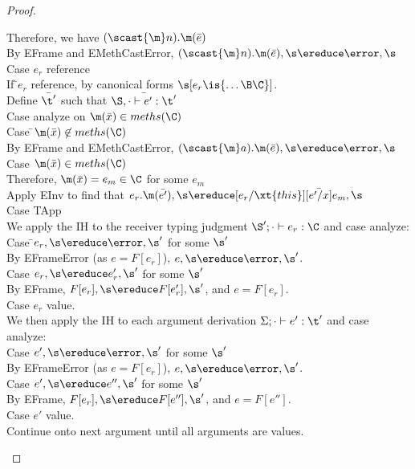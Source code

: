 \documentclass{report}
\begin{document}
\begin{proof}
\begin{tabbing}
\> \> \> Therefore, we have $(\scast{\m}n).\m(\bar{e})$\\
\> \> \> By EFrame and EMethCastError, $(\scast{\m}n).\m(\bar{e}),\s \ereduce \error,\s$\\
\> \> Case $e_r$ reference \\
\> \> \> If \=$e_r$ reference, by canonical forms $\s[e_r \is \{\ldots \B \C \}]$.\\
\> \> \> Define $\bar{\t'}$ such that $\bar{\S,\cdot \vdash e' : \t'}$\\
\> \> \> Case analyze on $\m(\bar{x}) \in meths(\C)$\\
\> \> \> \> Case \=$\m(\bar{x}) \not\in meths(\C)$ \\
\> \> \> \> \>  By EFrame and EMethCastError, $(\scast{\m}a).\m(\bar{e}),\s \ereduce \error,\s$\\
\> \> \> \> Case $\m(\bar{x}) \in meths(\C)$ \\
\> \> \> \> \> Therefore, $\m(\bar{x}) = e_m \in \C$ for some $e_m$\\
\> \> \> \> \> Apply EInv to find that $e_r.\m(\bar{e'}),\s \ereduce [e_r/\xt{this}][\bar{e'/x}]e_m,\s$ \\
Case TApp\\
\> We apply the IH to the receiver typing judgment $\S';\cdot \vdash e_r : \C$ and case analyze:\\
\> \> Case \=$e_r,\s \ereduce \error,\s'$ for some $\s'$\\
\> \> \> By EFrameError (as $e = F[e_r]$), $e,\s \ereduce \error,\s'$.\\
\> \> Case $e_r,\s \ereduce e_r',\s'$ for some $\s'$\\
\> \> \> By EFrame, $F[e_r],\s \ereduce F[e_r'],\s'$, and $e = F[e_r]$.\\
\> \> Case $e_r$ value.\\
\> We then apply the IH to each argument derivation $\Sigma;\cdot \vdash e' : \t'$ and case analyze:\\
\> \> Case $e',\s \ereduce \error,\s'$ for some $\s'$\\
\> \> \> By EFrameError (as $e = F[e_r]$), $e,\s \ereduce \error,\s'$.\\
\> \> Case $e',\s \ereduce e'',\s'$ for some $\s'$\\
\> \> \> By EFrame, $F[e_r],\s \ereduce F[e''],\s'$, and $e = F[e'']$.\\
\> \> Case $e'$ value.\\
\> \> \> Continue onto next argument until all arguments are values. \\

\end{tabbing}
\end{proof}
\end{document}
